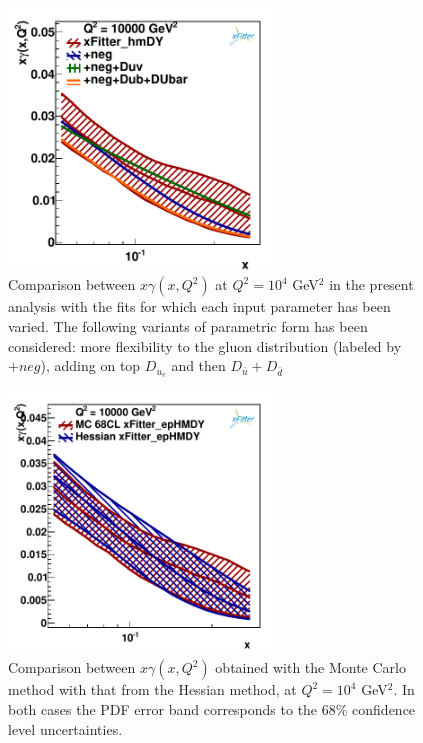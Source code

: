 \begin{figure}[h]
\centering
\includegraphics[width=7cm]{figs/q2_10000_pdf_ph_param_var.pdf}
\caption{ Comparison between $x\gamma(x,Q^2)$ at $Q^2=10^4$ GeV$^2$ in the present
  analysis with the fits for which each input parameter has been varied.
 The following variants of parametric form has been considered: more flexibility to the gluon distribution
(labeled by $+neg$), adding on top $D_{u_v}$ and then $D_{\bar{u}}+D_{\bar{d}}$ 
}
\label{fig:param}
\end{figure}

\begin{figure}[h]
\centering
\includegraphics[width=7cm]{figs/photon_mc_vs_hessian} 
\caption{Comparison between $x\gamma(x,Q^2)$ obtained with the
  Monte Carlo method with that from the Hessian method,
  at $Q^2=10^4$ GeV$^2$.
  In both cases the PDF error band corresponds to the 68\% confidence level
  uncertainties.}
\label{fig:photon_mc_vs_hessian}
\end{figure}


